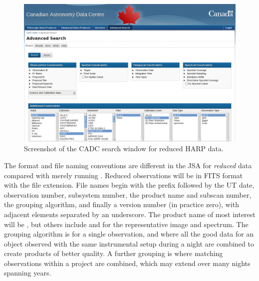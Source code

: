 \documentclass[11pt,oneside,chapters]{starlink}
\begin{document}
\begin{figure}[b!]
\begin{center}
\includegraphics[width=0.98\linewidth]{sc20_cadc}
\caption{\label{fig:cadc}
  Screenshot of the CADC search window for reduced HARP data.}
\end{center}
\end{figure}


The format and file naming conventions are different in the JSA for
\emph{reduced} data compared with merely running \ORACDR.  Reduced
observations will be in FITS format with the  file
extension.  File names begin with the  prefix followed by
the UT date, observation number, subsystem number, the product name
and subscan number, the grouping algorithm, and finally a version
number (in practice zero), with adjacent elements separated by an
underscore.  The product name of most interest will be ,
but others include  and  for the representative
image and spectrum.  The grouping algorithm is  for a single
observation, and  where all the good data for an object observed
with the same instrumental setup during a night are combined to create
products of better quality.  A further grouping is  where
matching observations within a project are combined, which may extend
over many nights spanning years.
\end{document}
